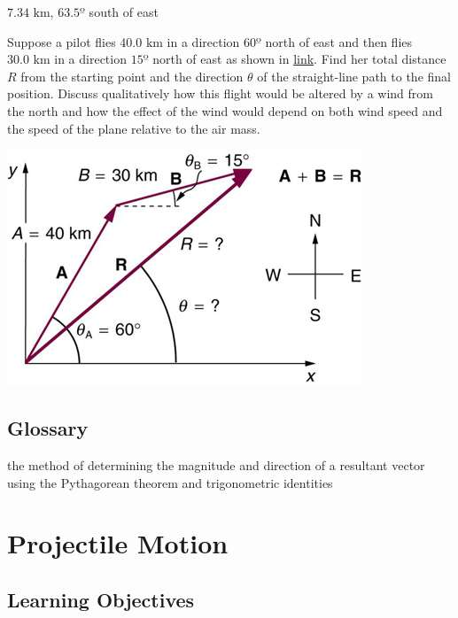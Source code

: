 \documentclass[
]{book}
\providecommand{\tightlist}{%
  \setlength{\itemsep}{0pt}\setlength{\parskip}{0pt}}
\begin{document}
\leavevmode{}%
\({7\text{.}\text{34\ km}}{}\), \({\text{63}\text{.}5º}{}\) south of east

\hypertarget{fs-id1955218}{}
\leavevmode{}%
Suppose a pilot flies \({\text{40}\text{.}\text{0\ km}}{}\) in a direction
\(\text{60º}{}\) north of east and then flies
\({\text{30}\text{.}\text{0\ km}}{}\) in a direction \(\text{15º}{}\) north
of east as shown in
\protect\hyperlink{import-auto-id1165298708571}{link}. Find her
total distance \(R{}\) from the starting point and the direction
\(\theta{}\) of the straight-line path to the final position. Discuss
qualitatively how this flight would be altered by a wind from the north
and how the effect of the wind would depend on both wind speed and the
speed of the plane relative to the air mass.

\includegraphics{images/Figure_03_03_13a.jpg}

\hypertarget{glossary-8}{%
\subsection{Glossary}\label{glossary-8}}

\begin{description}
\tightlist
\item[analytical method]
the method of determining the magnitude and direction of a resultant
vector using the Pythagorean theorem and trigonometric identities
\end{description}

\hypertarget{projectile-motion}{%
\section{Projectile Motion}\label{projectile-motion}}

\hypertarget{fs-id1563341}{}
\hypertarget{learning-objectives-10}{%
\subsection{Learning Objectives}\label{learning-objectives-10}}
\end{document}
